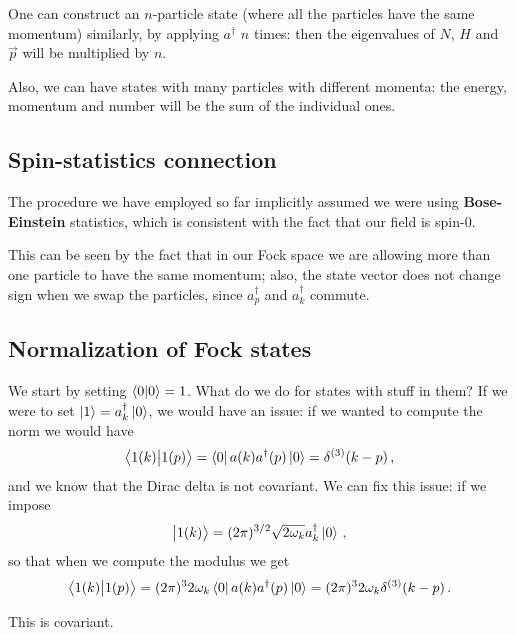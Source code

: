 \documentclass[main.tex]{subfiles}
\begin{document}
One can construct an \(n\)-particle state (where all the particles have the same momentum) similarly, by applying \(a ^\dag\) \(n\) times: then the eigenvalues of \(N\), \(H\) and \(\vec{p}\) will be multiplied by \(n\). 

Also, we can have states with many particles with different momenta: the energy, momentum and number will be the sum of the individual ones. 

\subsection{Spin-statistics connection}

The procedure we have employed so far implicitly assumed we were using \textbf{Bose-Einstein} statistics, which is consistent with the fact that our field is spin-0.

This can be seen by the fact that in our Fock space we are allowing more than one particle to have the same momentum; also, the state vector does not change sign when we swap the particles, since \(a ^\dag_{p}\) and \(a ^\dag_{k} \) commute.

\subsection{Normalization of Fock states}

We start by setting \(\braket{0}{0}= 1\).
What do we do for states with stuff in them? If we were to set \(\ket{1} = a ^\dag _k \ket{0}\), we would have an issue:  if we wanted to compute the norm we would have 
%
\begin{align}
\braket{1(k)}{1(p)} = \bra{0} a (k) a ^\dag (p) \ket{0} = \delta^{(3)} (k - p)
\,,
\end{align}
%
and we know that the Dirac delta is not covariant.
We can fix this issue: if we impose 
%
\begin{align}
\ket{1(k)} = (2 \pi )^{3/2} \sqrt{2 \omega_{k}} a ^\dag_{k} \ket{0}
\,,
\end{align}
%
so that when we compute the modulus we get 
%
\begin{align}
\braket{1(k)}{1(p)} = (2 \pi )^3 2 \omega_{k} \bra{0} a (k) a ^\dag (p) \ket{0} = %
(2 \pi )^3 2 \omega_{k} \delta^{(3)} (k - p)
\,.
\end{align}

\begin{claim}
This is covariant. 
\end{claim}
\end{document}

